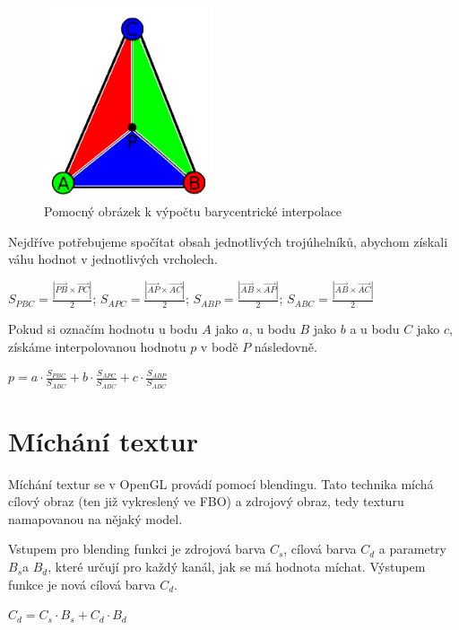 \documentclass[11pt,twoside,a4paper]{book}
\begin{document}
\begin{center}
\begin{figure}[h]
\includegraphics[width=50mm]{figures/interpolation.png}
\caption{Pomocný obrázek k výpočtu barycentrické interpolace}
\end{figure}
\end{center}

Nejdříve potřebujeme spočítat obsah jednotlivých trojúhelníků, abychom získali váhu hodnot v jednotlivých vrcholech.
\begin{center} 
$S_{PBC} = \frac{|\vec{PB} \times \vec{PC}|}{2}$;
$S_{APC} = \frac{|\vec{AP} \times \vec{AC}|}{2}$; 
$S_{ABP} = \frac{|\vec{AB} \times \vec{AP}|}{2}$;
$S_{ABC} = \frac{|\vec{AB} \times \vec{AC}|}{2}$
\end{center}

Pokud si označím hodnotu u bodu $A$ jako $a$, u bodu $B$ jako $b$ a u bodu $C$ jako $c$, získáme interpolovanou hodnotu $p$ v bodě $P$ následovně.
\begin{center}
$p = a \cdot \frac{S_{PBC}}{S_{ABC}} + b \cdot \frac{S_{APC}}{S_{ABC}} + c \cdot \frac{S_{ABP}}{S_{ABC}}$
\end{center}

\section{Míchání textur}

Míchání textur se v OpenGL provádí pomocí blendingu. Tato technika míchá cílový obraz (ten již vykreslený ve FBO) a zdrojový obraz, tedy texturu namapovanou na nějaký model.

Vstupem pro blending funkci je zdrojová barva $C_s$, cílová barva $C_d$ a parametry $B_s$\linebreak a $B_d$, které určují pro každý kanál, jak se má hodnota míchat. Výstupem funkce je nová cílová barva $C_d$.
\begin{center}
$C_d = C_s \cdot B_s + C_d \cdot B_d$
\end{center}
\end{document}

